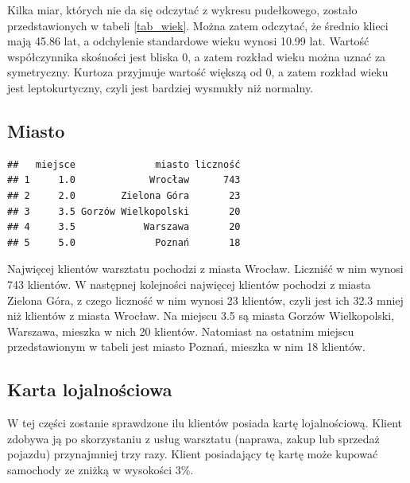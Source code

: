 \documentclass{article}\usepackage[]{graphicx}\usepackage[]{xcolor}
\makeatletter
\newenvironment{kframe}{%
 \def\at@end@of@kframe{}%
 \ifinner\ifhmode%
  \def\at@end@of@kframe{\end{minipage}}%
  \begin{minipage}{\columnwidth}%
 \fi\fi%
 \def\FrameCommand##1{\hskip\@totalleftmargin \hskip-\fboxsep
 \colorbox{shadecolor}{##1}\hskip-\fboxsep
     \hskip-\linewidth \hskip-\@totalleftmargin \hskip\columnwidth}%
 \MakeFramed {\advance\hsize-\width
   \@totalleftmargin\z@ \linewidth\hsize
   \@setminipage}}%
 {\par\unskip\endMakeFramed%
 \at@end@of@kframe}
\newenvironment{knitrout}{}{} %
\makeatother
\begin{document}
Kilka miar, których nie da się odczytać z wykresu pudełkowego, zostało przedstawionych w tabeli \ref{tab_wiek}. Można zatem odczytać, że średnio klieci mają 45.86 lat, a odchylenie standardowe wieku wynosi 10.99 lat. Wartość współczynnika skośności jest bliska 0, a zatem rozkład wieku można uznać za symetryczny. Kurtoza przyjmuje wartość większą od 0, a zatem rozkład wieku jest leptokurtyczny, czyli jest bardziej wysmukły niż normalny.

\subsection{Miasto}
\begin{knitrout}
\color{fgcolor}\begin{kframe}
\begin{verbatim}
##   miejsce              miasto liczność
## 1     1.0             Wrocław      743
## 2     2.0        Zielona Góra       23
## 3     3.5 Gorzów Wielkopolski       20
## 4     3.5            Warszawa       20
## 5     5.0              Poznań       18
\end{verbatim}
\end{kframe}
\end{knitrout}

Najwięcej klientów warsztatu pochodzi z miasta Wrocław. Liczniść w nim wynosi 743 klientów. W następnej kolejności najwięcej klientów pochodzi z miasta Zielona Góra, z czego liczność w nim wynosi 23 klientów, czyli jest ich 32.3 mniej niż klientów z miasta Wrocław. Na miejscu 3.5 są miasta Gorzów Wielkopolski, Warszawa, mieszka w nich 20 klientów. Natomiast na ostatnim miejscu przedstawionym w tabeli jest miasto Poznań, mieszka w nim 18 klientów.

\subsection{Karta lojalnościowa}

W tej części zostanie sprawdzone ilu klientów posiada kartę lojalnościową. Klient zdobywa ją po skorzystaniu z usług warsztatu (naprawa, zakup lub sprzedaż pojazdu) przynajmniej trzy razy. Klient posiadający tę kartę może kupować samochody ze zniżką w wysokości 3\%.
\end{document}
